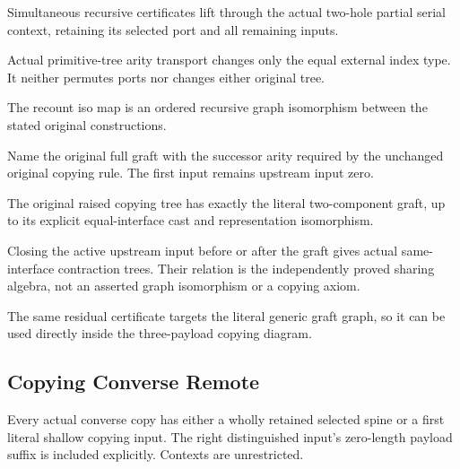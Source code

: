 Simultaneous recursive certificates lift through the actual two-hole partial serial context, retaining its selected port and all remaining inputs.
\par{}

Actual primitive-tree arity transport changes only the equal external index type. It neither permutes ports nor changes either original tree.
\par{}

The recount iso map is an ordered recursive graph isomorphism between the stated original constructions.
\par{}

Name the original full graft with the successor arity required by the unchanged original copying rule. The first input remains upstream input zero.
\par{}

The original raised copying tree has exactly the literal two-component graft, up to its explicit equal-interface cast and representation isomorphism.
\par{}

Closing the active upstream input before or after the graft gives actual same-interface contraction trees. Their relation is the independently proved sharing algebra, not an asserted graph isomorphism or a copying axiom.
\par{}

The same residual certificate targets the literal generic graft graph, so it can be used directly inside the three-payload copying diagram.
\par{}

\subsection{Copying Converse Remote}
Every actual converse copy has either a wholly retained selected spine or a first literal shallow copying input. The right distinguished input's zero-length payload suffix is included explicitly. Contexts are unrestricted.

